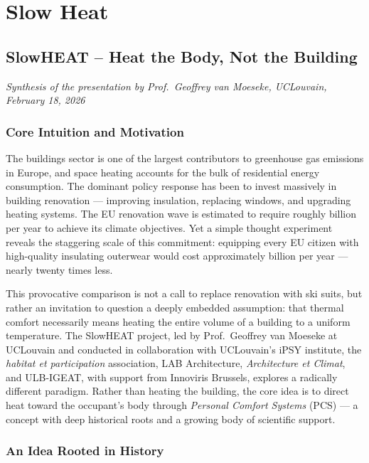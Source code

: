 \chapter{Slow Heat}


\section{SlowHEAT -- Heat the Body, Not the Building}
\textit{Synthesis of the presentation by Prof.\ Geoffrey van Moeseke,
UCLouvain, February 18, 2026}

\subsection{Core Intuition and Motivation}

The buildings sector is one of the largest contributors to
greenhouse gas emissions in Europe, and space heating accounts for
the bulk of residential energy consumption. The dominant policy
response has been to invest massively in building renovation ---
improving insulation, replacing windows, and upgrading heating
systems. The EU renovation wave is estimated to require roughly
 billion per year to achieve its climate objectives.
Yet a simple thought experiment reveals the staggering scale of
this commitment: equipping every EU citizen with high-quality
insulating outerwear would cost approximately  billion
per year --- nearly twenty times less.

This provocative comparison is not a call to replace renovation
with ski suits, but rather an invitation to question a deeply
embedded assumption: that thermal comfort necessarily means heating
the entire volume of a building to a uniform temperature. The
SlowHEAT project, led by Prof.\ Geoffrey van Moeseke at UCLouvain
and conducted in collaboration with UCLouvain's iPSY institute,
the \textit{habitat et participation} association, LAB Architecture,
\textit{Architecture et Climat}, and ULB-IGEAT, with support from
Innoviris Brussels, explores a radically different paradigm.
Rather than heating the building, the core idea is to direct heat
toward the occupant's body through \textit{Personal Comfort Systems}
(PCS) --- a concept with deep historical roots and a growing body
of scientific support.

\subsection{An Idea Rooted in History}

